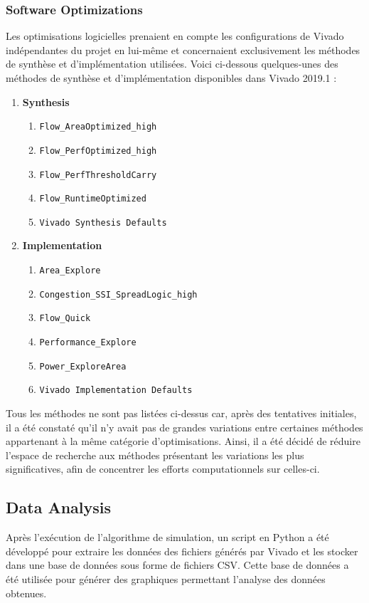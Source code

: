 \documentclass[../CSC_5RO07_TA.tex]{subfiles}
\begin{document}
\subsubsection{Software Optimizations}
\noindent Les optimisations logicielles prenaient en compte les configurations de Vivado indépendantes du projet en lui-même et concernaient exclusivement les méthodes de synthèse et d'implémentation utilisées. Voici ci-dessous quelques-unes des méthodes de synthèse et d'implémentation disponibles dans Vivado 2019.1 :
\begin{enumerate}
    \item \textbf{Synthesis}
    \begin{enumerate}[noitemsep]
        \item \texttt{Flow\_AreaOptimized\_high}
        \item \texttt{Flow\_PerfOptimized\_high}
        \item \texttt{Flow\_PerfThresholdCarry}
        \item \texttt{Flow\_RuntimeOptimized}
        \item \texttt{Vivado Synthesis Defaults}
    \end{enumerate}
    \item \textbf{Implementation}
    \begin{enumerate}[noitemsep]
        \item \texttt{Area\_Explore}
        \item \texttt{Congestion\_SSI\_SpreadLogic\_high}
        \item \texttt{Flow\_Quick}
        \item \texttt{Performance\_Explore}
        \item \texttt{Power\_ExploreArea}
        \item \texttt{Vivado Implementation Defaults}
    \end{enumerate}
\end{enumerate}

\noindent Tous les méthodes ne sont pas listées ci-dessus car, après des tentatives initiales, il a été constaté qu'il n'y avait pas de grandes variations entre certaines méthodes appartenant à la même catégorie d'optimisations. Ainsi, il a été décidé de réduire l'espace de recherche aux méthodes présentant les variations les plus significatives, afin de concentrer les efforts computationnels sur celles-ci.


\subsection{Data Analysis}
\noindent Après l'exécution de l'algorithme de simulation, un script en Python a été développé pour extraire les données des fichiers générés par Vivado et les stocker dans une base de données sous forme de fichiers CSV. Cette base de données a été utilisée pour générer des graphiques permettant l'analyse des données obtenues.
\end{document}
